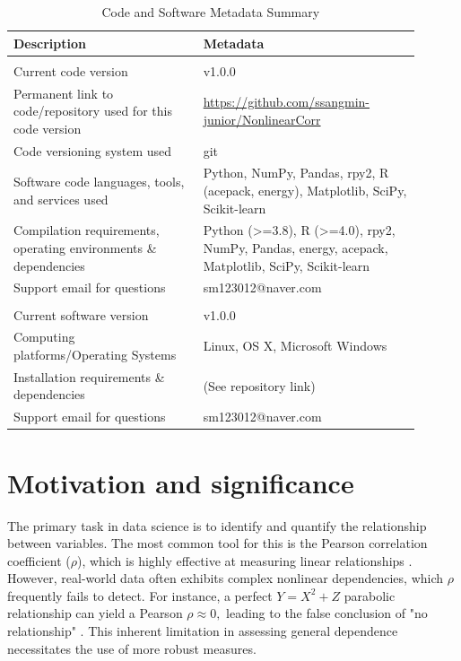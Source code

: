 \documentclass[a4paper,fleqn]{cas-sc}
\begin{document}
\begin{table}[!htbp]
\small\sloppy\setlength{\emergencystretch}{2em}\centering
\caption{Code and Software Metadata Summary}
\label{tbl:unifiedMetadata}
\renewcommand{\arraystretch}{1.15}
\begin{tabular}{|>{\raggedright\arraybackslash}p{0.42\linewidth}|>{\raggedright\arraybackslash}p{0.48\linewidth}|}
\hline
\textbf{Description} & \textbf{Metadata} \\
\hline
\multicolumn{2}{|l|}{\textbf{MANDATORY CODE METADATA}} \\
\hline
Current code version & v1.0.0 \\
Permanent link to code/repository used for this code version & \url{https://github.com/ssangmin-junior/NonlinearCorr} \\
Code versioning system used & git \\
Software code languages, tools, and services used & Python, NumPy, Pandas, rpy2, R (acepack, energy), Matplotlib, SciPy, Scikit-learn \\
Compilation requirements, operating environments \& dependencies & Python (>=3.8), R (>=4.0), rpy2, NumPy, Pandas, energy, acepack, Matplotlib, SciPy, Scikit-learn \\
Support email for questions & sm123012@naver.com \\
\hline
\multicolumn{2}{|l|}{\textbf{OPTIONAL EXECUTABLE SOFTWARE METADATA}} \\
\hline
Current software version & v1.0.0 \\
Computing platforms/Operating Systems & Linux, OS X, Microsoft Windows \\
Installation requirements \& dependencies & (See repository link) \\
Support email for questions & sm123012@naver.com \\
\hline
\end{tabular}
\end{table}

\par\medskip
\normalsize
\raggedright
\justify


\section{Motivation and significance}
\label{sec:motivation}
The primary task in data science is to identify and quantify the relationship between variables. The most common tool for this is the Pearson correlation coefficient ($\rho$), which is highly effective at measuring linear relationships \citep{CasellaBerger2002}. However, real-world data often exhibits complex nonlinear dependencies, which $\rho$ frequently fails to detect. For instance, a perfect $Y=X^{2}+Z$ parabolic relationship can yield a Pearson $\rho\approx0,$ leading to the false conclusion of "no relationship" \citep{CasellaBerger2002}. This inherent limitation in assessing general dependence necessitates the use of more robust measures.
\end{document}
